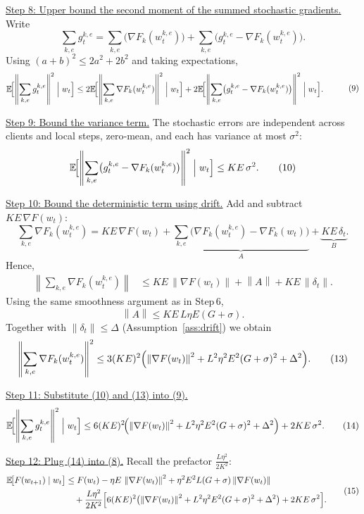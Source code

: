 \documentclass{article}
\newcommand{\E}{\mathbb{E}}
\newcommand{\norm}[1]{\left\|#1\right\|}
\begin{document}
\noindent\underline{Step 8: Upper bound the second moment of the summed stochastic gradients.}  
Write
\[
\sum_{k,e} g_{t}^{k,e}
= \sum_{k,e}\bigl(\nabla F_k(w_{t}^{k,e})\bigr)
+\sum_{k,e}\bigl(g_{t}^{k,e}-\nabla F_k(w_{t}^{k,e})\bigr).
\]
Using $(a+b)^2\le 2a^2+2b^2$ and taking expectations,
\[
\begin{aligned}
\E\!\Bigl[\norm{\sum_{k,e} g_{t}^{k,e}}^2\Bigm|w_t\Bigr]
&\le 2\E\!\Bigl[\norm{\sum_{k,e}\nabla F_k(w_{t}^{k,e})}^2\Bigm|w_t\Bigr]
   +2\E\!\Bigl[\norm{\sum_{k,e}\bigl(g_{t}^{k,e}-\nabla F_k(w_{t}^{k,e})\bigr)}^2\Bigm|w_t\Bigr].
\end{aligned}
\tag{9}
\]

\noindent\underline{Step 9: Bound the variance term.}  
The stochastic errors are independent across clients and local steps, zero‑mean, and each has variance at most $\sigma^2$:
\[
\E\!\Bigl[\norm{\sum_{k,e}\bigl(g_{t}^{k,e}-\nabla F_k(w_{t}^{k,e})\bigr)}^2\Bigm|w_t\Bigr]
\le KE\,\sigma^2 .
\tag{10}
\]

\noindent\underline{Step 10: Bound the deterministic term using drift.}  
Add and subtract $KE\,\nabla F(w_t)$:
\[
\sum_{k,e}\nabla F_k(w_{t}^{k,e})
= KE\,\nabla F(w_t)
   +\underbrace{\sum_{k,e}\bigl(\nabla F_k(w_{t}^{k,e})-\nabla F_k(w_t)\bigr)}_{A}
   +\underbrace{KE\,\delta_t}_{B}.
\]
Hence,
\[
\begin{aligned}
\norm{\sum_{k,e}\nabla F_k(w_{t}^{k,e})}
&\le KE\,\norm{\nabla F(w_t)}+\norm{A}+KE\,\norm{\delta_t}.
\end{aligned}
\tag{11}
\]
Using the same smoothness argument as in Step 6,
\[
\norm{A}\le KE\,L\eta E(G+\sigma).
\tag{12}
\]
Together with $\norm{\delta_t}\le\Delta$ (Assumption~\ref{ass:drift}) we obtain
\[
\norm{\sum_{k,e}\nabla F_k(w_{t}^{k,e})}^2
\le 3(KE)^2\Bigl(\norm{\nabla F(w_t)}^2+L^2\eta^2E^2(G+\sigma)^2+\Delta^2\Bigr).
\tag{13}
\]

\noindent\underline{Step 11: Substitute (10) and (13) into (9).}  
\[
\E\!\Bigl[\norm{\sum_{k,e} g_{t}^{k,e}}^2\Bigm|w_t\Bigr]
\le 6(KE)^2\!\Bigl(\norm{\nabla F(w_t)}^2+L^2\eta^2E^2(G+\sigma)^2+\Delta^2\Bigr)
+2KE\,\sigma^2 .
\tag{14}
\]

\noindent\underline{Step 12: Plug (14) into (8).}  
Recall the prefactor $\frac{L\eta^2}{2K^2}$:
\[
\begin{aligned}
\E\!\bigl[F(w_{t+1})\mid w_t\bigr]
&\le F(w_t)
-\eta E\,\norm{\nabla F(w_t)}^2
+ \eta^2 E^2 L (G+\sigma)\norm{\nabla F(w_t)}\\
&\quad+ \frac{L\eta^2}{2K^2}\Bigl[6(KE)^2\bigl(\norm{\nabla F(w_t)}^2+L^2\eta^2E^2(G+\sigma)^2+\Delta^2\bigr)
+2KE\,\sigma^2\Bigr].
\end{aligned}
\tag{15}
\]
\end{document}
